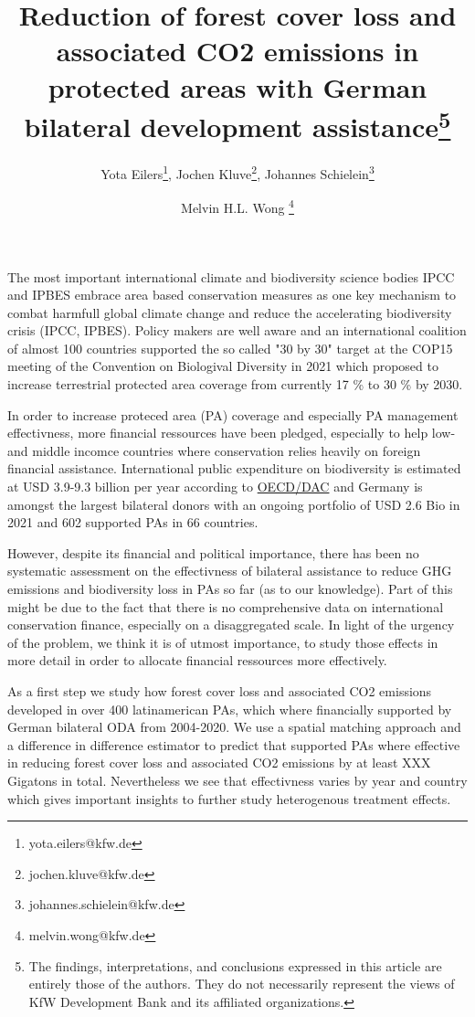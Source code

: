 \documentclass{article}
\title{Reduction of forest cover loss and associated CO2 emissions in protected areas with German bilateral development assistance\thanks{The findings, interpretations, and conclusions expressed in this article are entirely those of the authors. They do not necessarily represent the views of KfW Development Bank and its affiliated organizations.}}
\author{Yota Eilers\thanks{yota.eilers@kfw.de}, Jochen Kluve\thanks{jochen.kluve@kfw.de}, Johannes Schielein\thanks{johannes.schielein@kfw.de} \and Melvin H.L. Wong \thanks{melvin.wong@kfw.de}}
\begin{document}

\maketitle



The most important international climate and biodiversity science bodies IPCC and IPBES embrace area based conservation measures as one key mechanism to combat harmfull global climate change and reduce the accelerating biodiversity crisis (IPCC, IPBES). Policy makers are well aware and an international coalition of almost 100 countries supported the so called "30 by 30" target at the COP15 meeting of the Convention on Biologival Diversity in 2021 which proposed to increase terrestrial protected area coverage from currently 17 \% to 30 \% by 2030. 

In order to increase proteced area (PA) coverage and especially PA management effectivness, more financial ressources have been pledged, especially to help low- and middle incomce countries where conservation relies heavily on foreign financial assistance. International public expenditure on biodiversity is estimated at USD 3.9-9.3 billion per year according to \href{https://www.oecd.org/environment/resources/biodiversity/report-a-comprehensive-overview-of-global-biodiversity-finance.pdf}{OECD/DAC} and Germany is amongst the largest bilateral donors with an ongoing portfolio of USD 2.6 Bio in 2021 and 602 supported PAs in 66 countries. 

However, despite its financial and political importance, there has been no systematic assessment on the effectivness of bilateral assistance to reduce GHG emissions and biodiversity loss in PAs so far (as to our knowledge). Part of this might be due to the fact that there is no comprehensive data on international conservation finance, especially on a disaggregated scale. In light of the urgency of the problem, we think it is of utmost importance, to study those effects in more detail in order to allocate financial ressources more effectively.  

As a first step we study how forest cover loss and associated CO2 emissions developed in over 400 latinamerican PAs, which where financially supported by German bilateral ODA from 2004-2020. We use a spatial matching approach and a difference in difference estimator to predict that supported PAs where effective in reducing forest cover loss and associated CO2 emissions by at least \color{red}XXX \color{black} Gigatons in total. Nevertheless we see that effectivness varies by year and country which gives important insights to further study heterogenous treatment effects. 
\end{document}

